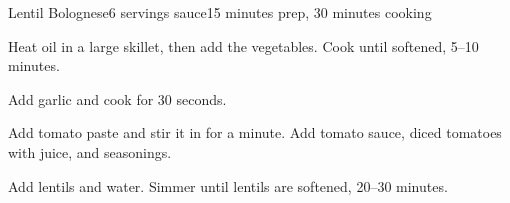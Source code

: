 \documentclass[../Cookbook.tex]{subfiles}
\begin{document}
\begin{recipe}{Lentil Bolognese}{6 servings sauce}{15 minutes prep, 30 minutes cooking}

Heat oil in a large skillet, then add the vegetables. Cook until softened, 5--10 minutes.

Add garlic and cook for 30 seconds.

Add tomato paste and stir it in for a minute. Add tomato sauce, diced tomatoes with juice, and seasonings.

Add lentils and water. Simmer until lentils are softened, 20--30 minutes.

\end{recipe}
\end{document}
